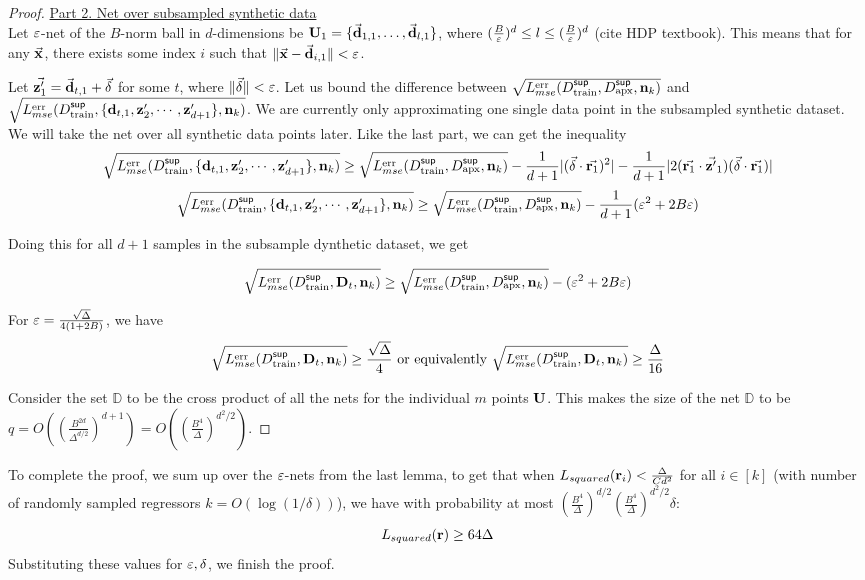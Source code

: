 \begin{proof}
\underline{Part 2. Net over subsampled synthetic data} \\
Let ${\varepsilon}$-net of the $B$-norm ball in $d$-dimensions be  ${\mathbf{U}}_1 =\{\vec{{\mathbf{d}}}_{1,1},\dots,\vec{{\mathbf{d}}}_{l,1}\}$, where $(\frac{B}{{\varepsilon}})^d\leq l \leq(\frac{B}{{\varepsilon}})^d$ (cite HDP textbook). This means that for any $\vec{{\mathbf{x}}}$, there exists some index $i$ such that $\|\vec{{\mathbf{x}}} -  \vec{{\mathbf{d}}}_{i,1}\| < {\varepsilon}$.

Let $\vec{{\mathbf{z}}'_1} = \vec{{\mathbf{d}}}_{t,1} + \vec{\delta}$ for some $t$, where $\|\vec{\delta}\| < {\varepsilon}$. Let us bound the difference between $\sqrt{L^{\textnormal{err}}_{mse}(D^{\sf sup}_{\textnormal{train}}, D^{\sf sup}_{\textnormal{apx}}, {\mathbf{n}}_k)}$ and $\sqrt{L^{\textnormal{err}}_{mse}(D^{\sf sup}_{\textnormal{train}}, \{{\mathbf{d}}_{t,1},{\mathbf{z}}'_2,\cdots, {\mathbf{z}}'_{d+1}\}, {\mathbf{n}}_k)}$.
We are currently only approximating one single data point in the subsampled synthetic dataset. We will take the net over all synthetic data points later.
Like the last part, we can get the inequality
\[
    \sqrt{L^{\textnormal{err}}_{mse}(D^{\sf sup}_{\textnormal{train}}, \{{\mathbf{d}}_{t,1},{\mathbf{z}}'_2,\cdots, {\mathbf{z}}'_{d+1}\}, {\mathbf{n}}_k)} \geq \sqrt{L^{\textnormal{err}}_{mse}(D^{\sf sup}_{\textnormal{train}}, D^{\sf sup}_{\textnormal{apx}}, {\mathbf{n}}_k)} -\frac{1}{d+1}|(\vec{\delta}\cdot\vec{{\mathbf{r}}_1})^2| -\frac{1}{d+1}|2(\vec{{\mathbf{r}}_1}\cdot\vec{{\mathbf{z}}'}_1)(\vec{\delta}\cdot\vec{{\mathbf{r}}_1})|
\]
\[
    \sqrt{L^{\textnormal{err}}_{mse}(D^{\sf sup}_{\textnormal{train}}, \{{\mathbf{d}}_{t,1},{\mathbf{z}}'_2,\cdots, {\mathbf{z}}'_{d+1}\}, {\mathbf{n}}_k)} \geq \sqrt{L^{\textnormal{err}}_{mse}(D^{\sf sup}_{\textnormal{train}}, D^{\sf sup}_{\textnormal{apx}}, {\mathbf{n}}_k)} -\frac{1}{d+1}({\varepsilon}^2 + 2B{\varepsilon})
\]

Doing this for all $d+1$ samples in the subsample dynthetic dataset, we get

\[
    \sqrt{L^{\textnormal{err}}_{mse}(D^{\sf sup}_{\textnormal{train}}, {\mathbf{D}}_t, {\mathbf{n}}_k)} \geq \sqrt{L^{\textnormal{err}}_{mse}(D^{\sf sup}_{\textnormal{train}}, D^{\sf sup}_{\textnormal{apx}}, {\mathbf{n}}_k)} -({\varepsilon}^2 + 2B{\varepsilon})
\]

For ${\varepsilon} = \frac{\sqrt{\Delta}}{4(1+2B)}$, we have
\[
     \sqrt{L^{\textnormal{err}}_{mse}(D^{\sf sup}_{\textnormal{train}}, {\mathbf{D}}_t, {\mathbf{n}}_k)} \geq \frac{\sqrt{\Delta}}{4} \text{ or equivalently } { \sqrt{L^{\ensuremath{\textnormal{err}}}_{mse}(D^{\sf sup}_{\ensuremath{\textnormal{train}}}, {\mathbf{D}}_t, {\mathbf{n}}_k)}} \geq \frac{{\Delta}}{16}
\]

Consider the set $\mathbb{D}$ to be the cross product of all the nets for the individual $m$ points ${\mathbf{U}}$. This makes the size of the net $\mathbb{D}$ to be $q =O( \left(\frac{B^{2d}}{\Delta^{d/2}} \right)^{d+1}) = O( \left(\frac{B^{4}}{\Delta} \right)^{d^2/2})$.
\end{proof}

To complete the proof, we sum up over the ${\varepsilon}$-nets from the last lemma, to get that when $L_{squared}({\mathbf{r}}_i) < \frac{\Delta}{Cd^2}$ for all $i \in [k]$ (with number of randomly sampled regressors $k = O(\log(1/\delta))$), we have with probability at most
$\left(\frac{B^{4}}{\Delta}\right)^{d/2} \left(\frac{B^{4}}{\Delta}\right)^{d^2/2}\delta$:
\[
    L_{squared}({\mathbf{r}}) \geq {64}{\Delta}
\]
Substituting these values for ${\varepsilon}, \delta$, we finish the proof.

\fi